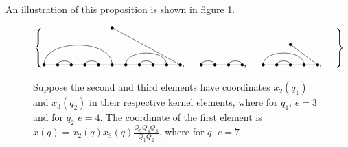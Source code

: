 \documentclass{amsart}
\begin{document}
 An illustration of this proposition is shown in figure \ref{coeff example}.
 
 
 \begin{figure}
 	\def\cbasisspacing{5mm}
 	
 	$\cbr{
 		\begin{gathered}
 		\GeneralizedMatching{11}{1/6, 2/3,4/5,7/10,8/9}{1}{11/1}{11/8}, \hspace{\cbasisspacing}
 		\Matching{4}{1/2, 3/4}, 
 		\hspace{\cbasisspacing}
 		\GeneralizedMatching{5}{1/4, 2/3}{1}{5/1}{3/4}, \hspace{\cbasisspacing}
 		\end{gathered}}$ 
 	\caption{Suppose the second and third elements have coordinates $x_2(q_1)$ and $x_3(q_2)$ in their respective kernel elements, where for $q_1$, $e=3$ and for $q_2$ $e=4$. The coordinate of the first element is $x(q)=x_2(q)x_3(q)\frac{Q_5Q_4Q_3}{Q_1Q_2}$, where for $q$, $e=7$}
 	\label{coeff example}
 \end{figure} 
 
\end{document}
